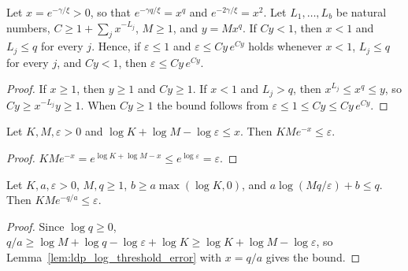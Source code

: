\begin{lemma}
    \label{thm:ldp_injectivity_cutoff}
    \leanok
    Let $x=e^{-\gamma/\xi}>0$, so that $e^{-\gamma q/\xi}=x^q$ and
    $e^{-2\gamma/\xi}=x^2$. Let
    $L_1,\dots,L_b$ be natural numbers, $C\geq1+\sum_jx^{-L_j}$, $M\geq1$, and
    $y=Mx^q$. If $Cy<1$, then $x<1$ and $L_j\leq q$ for every $j$. Hence, if
    $\varepsilon\leq1$ and $\varepsilon\leq Cy\,e^{Cy}$ holds whenever $x<1$,
    $L_j\leq q$ for every $j$, and $Cy<1$, then $\varepsilon\leq Cy\,e^{Cy}$.
\end{lemma}
\begin{proof}
    \leanok
    If $x\geq1$, then $y\geq1$ and $Cy\geq1$. If $x<1$ and $L_j>q$, then
    $x^{L_j}\leq x^q\leq y$, so $Cy\geq x^{-L_j}y\geq1$. When $Cy\geq1$ the
    bound follows from $\varepsilon\leq1\leq Cy\leq Cy\,e^{Cy}$.
\end{proof}

\begin{lemma}
    \label{lem:ldp_log_threshold_error}
    \leanok
    Let $K,M,\varepsilon>0$ and $\log K+\log M-\log\varepsilon\leq x$. Then
    $KMe^{-x}\leq\varepsilon$.
\end{lemma}
\begin{proof}
    \leanok
    $KMe^{-x}=e^{\log K+\log M-x}\leq e^{\log\varepsilon}=\varepsilon$.
\end{proof}

\begin{lemma}
    \label{lem:ldp_block_length_threshold_error}
    \leanok
    Let $K,a,\varepsilon>0$, $M,q\geq1$, $b\geq a\max(\log K,0)$, and
    $a\log(Mq/\varepsilon)+b\leq q$. Then $KMe^{-q/a}\leq\varepsilon$.
\end{lemma}
\begin{proof}
    \leanok
    Since $\log q\geq0$, $q/a\geq\log M+\log q-\log\varepsilon+\log K\geq
        \log K+\log M-\log\varepsilon$, so
    Lemma~\ref{lem:ldp_log_threshold_error} with $x=q/a$ gives the bound.
\end{proof}

